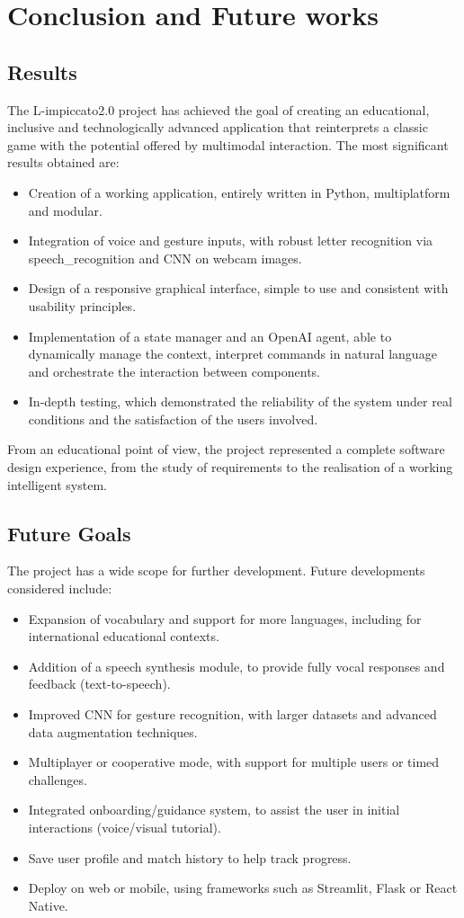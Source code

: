 \section{Conclusion and Future works}
\subsection{Results}
The L-impiccato2.0 project has achieved the goal of creating an educational, inclusive and technologically advanced application that reinterprets a classic game with the potential offered by multimodal interaction. The most significant results obtained are:
\begin{itemize}
    \item Creation of a working application, entirely written in Python, multiplatform and modular.
    \item  Integration of voice and gesture inputs, with robust letter recognition via speech\_recognition and CNN on webcam images.
    \item Design of a responsive graphical interface, simple to use and consistent with usability principles.
    \item Implementation of a state manager and an OpenAI agent, able to dynamically manage the context, interpret commands in natural language and orchestrate the interaction between components.
    \item In-depth testing, which demonstrated the reliability of the system under real conditions and the satisfaction of the users involved.
\end{itemize}

From an educational point of view, the project represented a complete software design experience, from the study of requirements to the realisation of a working intelligent system.

\subsection{Future Goals}
The project has a wide scope for further development. Future developments considered include:
\begin{itemize}
    \item Expansion of vocabulary and support for more languages, including for international educational contexts.
    \item Addition of a speech synthesis module, to provide fully vocal responses and feedback (text-to-speech).
    \item Improved CNN for gesture recognition, with larger datasets and advanced data augmentation techniques.
    \item Multiplayer or cooperative mode, with support for multiple users or timed challenges.
    \item Integrated onboarding/guidance system, to assist the user in initial interactions (voice/visual tutorial).
    \item Save user profile and match history to help track progress.
    \item Deploy on web or mobile, using frameworks such as Streamlit, Flask or React Native.
\end{itemize}


